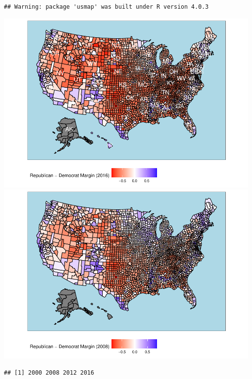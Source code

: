 \documentclass[
  english,
  man]{apa6}
\begin{document}
\begin{verbatim}
## Warning: package 'usmap' was built under R version 4.0.3
\end{verbatim}

\includegraphics{Script_files/figure-latex/visualization part 2-1.pdf} \includegraphics{Script_files/figure-latex/visualization part 2-2.pdf}

\begin{verbatim}
## [1] 2000 2008 2012 2016
\end{verbatim}
\end{document}
